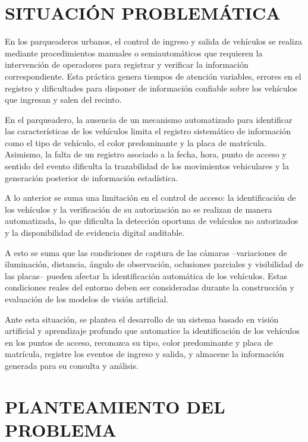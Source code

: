 \section*{SITUACIÓN PROBLEMÁTICA}

En los parqueaderos urbanos, el control de ingreso y salida de vehículos
se realiza mediante procedimientos manuales o semiautomáticos que requieren
la intervención de operadores para registrar y verificar la información
correspondiente. Esta práctica genera tiempos de atención variables, errores
en el registro y dificultades para disponer de información confiable sobre
los vehículos que ingresan y salen del recinto.

En el parqueadero, la ausencia de un mecanismo automatizado
para identificar las características de los vehículos limita el registro
sistemático de información como el tipo de vehículo, el color predominante
y la placa de matrícula. Asimismo, la falta de un registro asociado a la
fecha, hora, punto de acceso y sentido del evento dificulta la trazabilidad
de los movimientos vehiculares y la generación posterior de información
estadística.

A lo anterior se suma una limitación en el control de acceso: la
identificación de los vehículos y la verificación de su autorización no se
realizan de manera automatizada, lo que dificulta la detección oportuna de
vehículos no autorizados y la disponibilidad de evidencia digital auditable.

A esto se suma que las condiciones de captura de las cámaras --variaciones
de iluminación, distancia, ángulo de observación, oclusiones parciales y
visibilidad de las placas-- pueden afectar la identificación automática de los
vehículos. Estas condiciones reales del entorno deben ser consideradas
durante la construcción y evaluación de los modelos de visión artificial.

Ante esta situación, se plantea el desarrollo de un sistema basado en visión
artificial y aprendizaje profundo que automatice la identificación de los
vehículos en los puntos de acceso, reconozca su tipo, color predominante y
placa de matrícula, registre los eventos de ingreso y salida, y almacene la
información generada para su consulta y análisis.

\section*{PLANTEAMIENTO DEL PROBLEMA}

